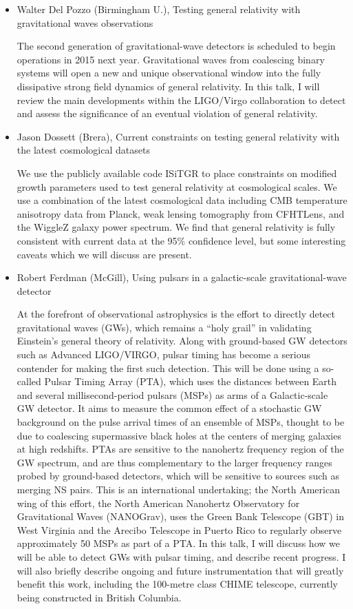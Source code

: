\documentclass[letterpaper,12pt]{article}
\newcommand{\talk}[2]{{\fontspec{Lato Bold} #1,} {\fontspec{Lato Italic} #2}}
\begin{document}
\begin{itemize}
\item \talk{Walter Del Pozzo (Birmingham U.)}{Testing general relativity with gravitational waves observations}

The second generation of gravitational-wave detectors is scheduled to begin operations in 2015 next year. Gravitational waves from coalescing binary systems will open a new and unique observational window into the fully dissipative strong field dynamics of general relativity. In this talk, I will review the main developments within the LIGO/Virgo collaboration to detect and assess the significance of an eventual violation of general relativity.

\item \talk{Jason Dossett (Brera)}{Current constraints on testing general relativity with the latest cosmological datasets}

We use the publicly available code ISiTGR to place constraints on modified growth parameters used to test general relativity at cosmological scales.  We use a combination of the latest cosmological data including CMB temperature anisotropy data from Planck, weak lensing tomography from CFHTLens, and the WiggleZ galaxy power spectrum. We find that general relativity is fully consistent with current data at the 95\% confidence level, but some interesting caveats which we will discuss are present.

\item \talk{Robert Ferdman (McGill)}{Using pulsars in a galactic-scale gravitational-wave detector}

At the forefront of observational astrophysics is the effort to directly detect gravitational waves (GWs), which remains a ``holy grail'' in validating Einstein's general theory of relativity.  Along with ground-based GW detectors such as Advanced LIGO/VIRGO, pulsar timing has become a serious contender for making the first such detection.  This will be done using a so-called Pulsar Timing Array (PTA), which uses the distances between Earth and several millisecond-period pulsars (MSPs) as arms of a Galactic-scale GW detector. It aims to measure the common effect of a stochastic GW background on the pulse arrival times of an ensemble of MSPs, thought to be due to coalescing supermassive black holes at the centers of merging galaxies at high redshifts.  PTAs are sensitive to the nanohertz frequency region of the GW spectrum, and are thus complementary to the larger frequency ranges probed by ground-based detectors, which will be sensitive to sources such as merging NS pairs.
 This is an international undertaking; the North American wing of this effort, the North American Nanohertz Observatory for Gravitational Waves (NANOGrav), uses the Green Bank Telescope (GBT) in West Virginia and the Arecibo Telescope in Puerto Rico to regularly observe approximately 50 MSPs as part of a PTA.  In this talk, I will discuss how we will be able to detect GWs with pulsar timing, and describe recent progress.  I will also briefly describe ongoing and future instrumentation that will greatly benefit this work, including the 100-metre class CHIME telescope, currently being constructed in British Columbia.


\end{itemize}
\end{document}
